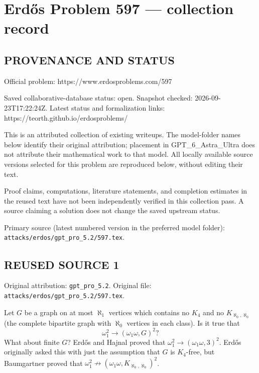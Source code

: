 \section*{Erd\H{o}s Problem 597 --- collection record}

\subsection*{PROVENANCE AND STATUS}
Official problem: https://www.erdosproblems.com/597

Saved collaborative-database status: open.
Snapshot checked: 2026-09-23T17:22:24Z.
Latest status and formalization links: https://teorth.github.io/erdosproblems/

This is an attributed collection of existing writeups. The model-folder names below identify their original attribution; placement in GPT\_6\_Astra\_Ultra does not attribute their mathematical work to that model. All locally available source versions selected for this problem are reproduced below, without editing their text.

Proof claims, computations, literature statements, and completion estimates in the reused text have not been independently verified in this collection pass. A source claiming a solution does not change the saved upstream status.

Primary source (latest numbered version in the preferred model folder): \texttt{attacks/erdos/gpt\_pro\_5.2/597.tex}.

\subsection*{REUSED SOURCE 1}
Original attribution: \texttt{gpt\_pro\_5.2}.
Original file: \texttt{attacks/erdos/gpt\_pro\_5.2/597.tex}.



Let $G$ be a graph on at most $\aleph_1$ vertices which contains no $K_4$ and no $K_{\aleph_0,\aleph_0}$ (the complete bipartite graph with $\aleph_0$ vertices in each class). Is it true that\[\omega_1^2 \to (\omega_1\omega, G)^2?\]
What about finite $G$? Erd\H{o}s and Hajnal proved that $\omega_1^2 \to (\omega_1\omega,3)^2$. Erd\H{o}s originally asked this with just the assumption that $G$ is $K_4$-free, but Baumgartner proved that $\omega_1^2 \not\to (\omega_1\omega, K_{\aleph_0,\aleph_0})^2$.

